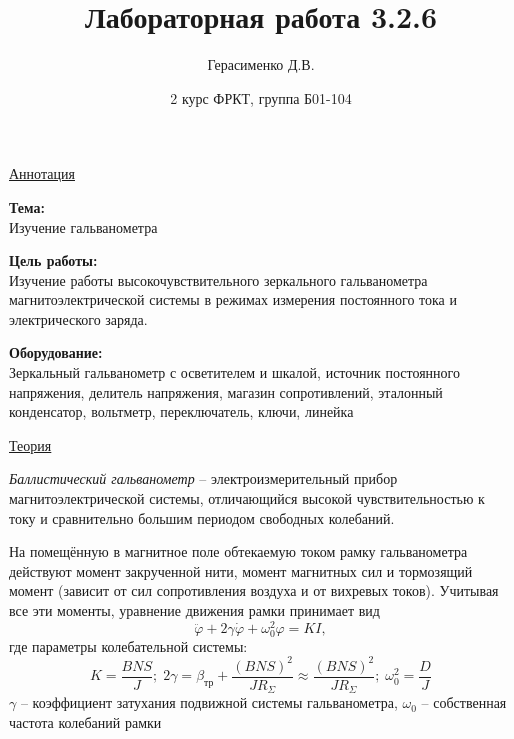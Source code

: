 \documentclass[a4paper]{article}
\title{
    \textbf{Лабораторная работа 3.2.6}
}
\author{Герасименко Д.В.}
\date{2 курс ФРКТ, группа Б01-104}
\begin{document}
\maketitle

\begin{center}
    \raggedleft
        \underline{\underline{\LARGE {Аннотация}}}
\end{center}

\begin{center}
\raggedright
    \large{\textbf{Тема:}}
    \\
    \large {Изучение гальванометра}
    
    \large{\textbf{Цель работы:}}
    \\
    \large {Изучение работы высокочувствительного зеркального гальванометра магнитоэлектрической системы в режимах измерения постоянного тока и электрического заряда.}
    
    \large{\textbf{Оборудование:}}
    \\
    \large{Зеркальный гальванометр с осветителем и шкалой, источник постоянного напряжения, делитель напряжения, магазин сопротивлений, эталонный конденсатор, вольтметр, переключатель, ключи, линейка}
\end{center}

\begin{center}
    \raggedleft
        \underline{\underline{\LARGE {Теория}}}
\end{center}

\textit{Баллистический гальванометр} -- электроизмерительный прибор магнитоэлектрической системы, отличающийся высокой чувствительностью к току и сравнительно большим периодом свободных колебаний. \par
На помещённую в магнитное поле обтекаемую током рамку гальванометра действуют момент закрученной нити, момент магнитных сил и тормозящий момент (зависит от сил сопротивления воздуха и от вихревых токов). Учитывая все эти моменты, уравнение движения рамки принимает вид
\begin{equation}
    \ddot \varphi + 2 \gamma \dot \varphi + \omega_0^2\varphi = KI,
\end{equation}
где параметры колебательной системы:
\begin{equation*}
    K = \frac{BNS}{J}; \; 2\gamma = \beta_{\text{тр}} + \frac{(BNS)^{2}}{JR_{\Sigma}} \approx \frac{(BNS)^{2}}{JR_{\Sigma}}; \; \omega_{0}^{2} = \frac{D}{J}
\end{equation*}
$\gamma$ -- коэффициент затухания подвижной системы гальванометра, $\omega_0$ -- собственная частота колебаний рамки
\end{document}

